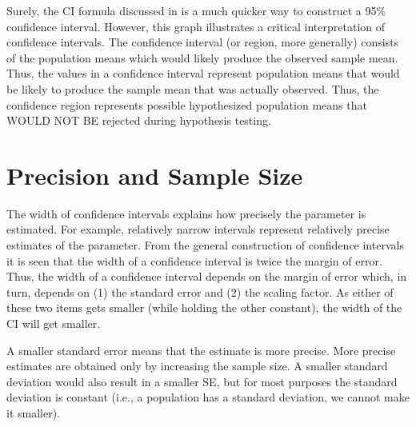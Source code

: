 \documentclass[10pt,openany]{book}\usepackage[]{graphicx}\usepackage[]{color}
\begin{document}
Surely, the CI formula discussed in  is a much quicker way to construct a 95\% confidence interval.  However, this graph illustrates a critical interpretation of confidence intervals.  The confidence interval (or region, more generally) consists of the population means which would likely produce the observed sample mean.  Thus, the values in a confidence interval represent population means that would be likely to produce the sample mean that was actually observed.  Thus, the confidence region represents possible hypothesized population means that WOULD NOT BE rejected during hypothesis testing.


\section{Precision and Sample Size} 
The width of confidence intervals explains how precisely the parameter is estimated.  For example, relatively narrow intervals represent relatively precise estimates of the parameter.  From the general construction of confidence intervals it is seen that the width of a confidence interval is twice the margin of error.  Thus, the width of a confidence interval depends on the margin of error which, in turn, depends on (1) the standard error and (2) the scaling factor.  As either of these two items gets smaller (while holding the other constant), the width of the CI will get smaller.


\vspace{-12pt}

A smaller standard error means that the estimate is more precise.  More precise estimates are obtained only by increasing the sample size.  A smaller standard deviation would also result in a smaller SE, but for most purposes the standard deviation is constant (i.e., a population has a standard deviation, we cannot make it smaller).

\end{document}

